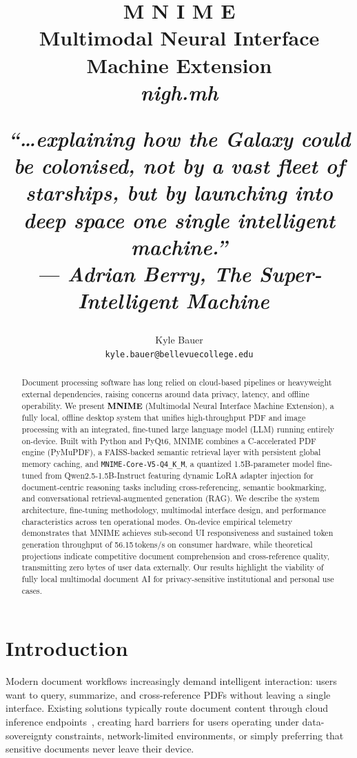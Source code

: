 \documentclass[11pt]{article}
\title{{\huge \textbf{M \hspace{2.0em} N \hspace{2.0em} I \hspace{2.0em} M \hspace{2.0em} E}}\\[0.45em]
{\large Multimodal Neural Interface Machine Extension}\\[0.25em]
{\normalsize \textit{nigh.mh}}\\[0.8em]
\parbox{0.82\textwidth}{\centering\small\normalfont\itshape ``\dots explaining how the Galaxy could be colonised, not by a vast fleet of starships, but by launching into deep space one single intelligent machine.''\\[0.3em]
{\footnotesize\normalfont --- Adrian Berry, \textit{The Super-Intelligent Machine}~\citep{berry1983superintelligent}}}}
\author{
  Kyle Bauer \\
  \texttt{kyle.bauer@bellevuecollege.edu}
}
\begin{document}
\maketitle

\begin{abstract}
Document processing software has long relied on cloud-based pipelines or
heavyweight external dependencies, raising concerns around data privacy,
latency, and offline operability.
We present \textbf{MNIME} (Multimodal Neural Interface Machine Extension),
a fully local, offline desktop system that unifies high-throughput PDF and
image processing with an integrated, fine-tuned large language model (LLM)
running entirely on-device.
Built with Python and PyQt6, MNIME combines a C-accelerated PDF engine
(PyMuPDF), a FAISS-backed semantic retrieval layer with persistent global memory caching, and
\texttt{MNIME-Core-V5-Q4\_K\_M}, a quantized 1.5B-parameter model
fine-tuned from Qwen2.5-1.5B-Instruct featuring dynamic LoRA adapter injection for document-centric reasoning tasks
including cross-referencing, semantic bookmarking, and conversational
retrieval-augmented generation (RAG).
We describe the system architecture, fine-tuning methodology, multimodal
interface design, and performance characteristics across ten operational modes.
On-device empirical telemetry demonstrates that MNIME achieves sub-second UI responsiveness
and sustained token generation throughput of 56.15\,tokens/s on consumer hardware,
while theoretical projections indicate competitive document comprehension and cross-reference
quality, transmitting zero bytes of user data externally.
Our results highlight the viability of fully local multimodal document AI
for privacy-sensitive institutional and personal use cases.
\end{abstract}

\section{Introduction}
\label{sec:intro}

Modern document workflows increasingly demand intelligent interaction: users
want to query, summarize, and cross-reference PDFs without leaving a single
interface.
Existing solutions typically route document content through cloud inference
endpoints~\cite{openai2024gpt4,gemini2025}, creating hard barriers for users
operating under data-sovereignty constraints, network-limited environments,
or simply preferring that sensitive documents never leave their device.
\end{document}
